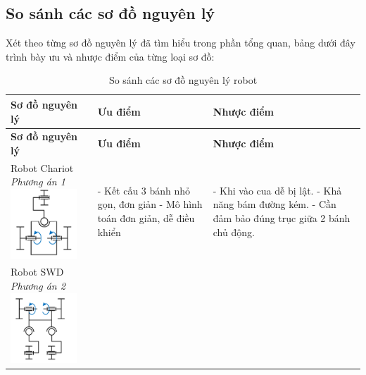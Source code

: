         \subsection{So sánh các sơ đồ nguyên lý}
            \hspace*{0.6cm}Xét theo từng sơ đồ nguyên lý đã tìm hiểu trong phần tổng quan, bảng dưới đây 
trình bày ưu và nhược điểm của từng loại sơ đồ:
            \begin{longtable}{|p{4cm}|p{5cm}|p{5cm}|}
                \caption{So sánh các sơ đồ nguyên lý robot} 
                \label{tab:compare_robot_schemes} \\ 
                \hline
                \textbf{Sơ đồ nguyên lý} & \textbf{Ưu điểm} & \textbf{Nhược điểm} \\
                \hline
                \endfirsthead
                \hline
                \textbf{Sơ đồ nguyên lý} & \textbf{Ưu điểm} & \textbf{Nhược điểm} \\
                \hline
                \endhead
                \hline
                \endfoot
                \hline
                \endlastfoot
                Robot Chariot \newline
                \textit{Phương án 1} \newline
                \includegraphics[width=2.5cm]{pictures/chapter2/robot_chariot.png} & 
                - Kết cấu 3 bánh nhỏ gọn, đơn giản \newline
                - Mô hình toán đơn giản, dễ điều khiển & 
                - Khi vào cua dễ bị lật. \newline
                - Khả năng bám đường kém. \newline
                - Cần đảm bảo đúng trục giữa 2 bánh chủ động. \\
                \hline
                Robot SWD \newline
                \textit{Phương án 2} \newline
                \includegraphics[width=2.5cm]{pictures/chapter2/robot_swd.png} & 

\end{longtable}
